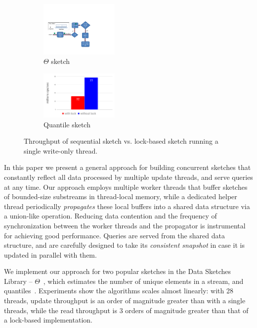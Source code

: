 \begin{figure}[t!]
    \centering
    \begin{subfigure}[t]{0.49\columnwidth}
       \centering
        \includegraphics[width=1.5in]{images/seqTheta}
        \caption{$\Theta$ sketch}
        \label{fig:LockIsBadTheta}
    \end{subfigure}%
    \begin{subfigure}[t]{0.49\columnwidth}
        \centering
        \includegraphics[width=1.5in]{images/seqQuantiles}
        \caption{Quantile sketch}
        \label{fig:LockIsBadQuantiles}
    \end{subfigure}
    \caption{Throughput of sequential sketch vs. lock-based sketch running a single write-only thread.}
    \label{fig:lockBased}
\end{figure}



In this paper 
we present a general approach for building concurrent sketches that
constantly reflect all data processed by multiple update threads, 
and serve queries at any time. %
Our  approach employs multiple worker threads that buffer sketches of bounded-size substreams in thread-local memory, while a dedicated helper thread 
periodically \emph{propagates} these local buffers into a shared data structure via a union-like operation.
 Reducing data contention and the frequency of synchronization between the worker threads and the propagator is instrumental for achieving good performance. Queries are served from the shared data structure, and are carefully 
 designed to take its \emph{consistent snapshot} in case it is updated in parallel with them.

We implement our approach for two popular sketches in the Data Sketches Library -- $\Theta$~\cite{Theta},
which estimates the number of unique elements in a stream, and quantiles~\cite{quantiles}.
Experiments show the algorithms scales almost linearly: with 28 threads, update throughput is an order of magnitude greater than with a single threads, while the 
read throughput is 3 orders of magnitude greater than that of a lock-based implementation.  


 
